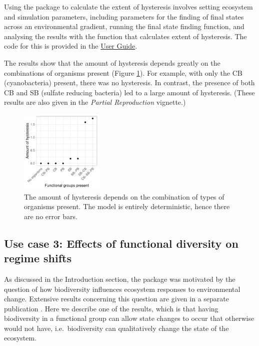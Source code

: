 \documentclass[]{elsarticle} %
\begin{document}
Using the package to calculate the extent of hysteresis involves setting ecosystem and simulation parameters, including parameters for the finding of final states across an environmental gradient, running the final state finding function, and analysing the results with the function that calculates extent of hysteresis. The code for this is provided in the \href{https://uzh-peg.r-universe.dev/articles/microxanox/User-guide.html}{User Guide}.

The results show that the amount of hysteresis depends greatly on the combinations of organisms present (Figure \ref{fig:uc2}). For example, with only the CB (cyanobacteria) present, there was no hysteresis. In contrast, the presence of both CB and SB (sulfate reducing bacteria) led to a large amount of hysteresis. (These results are also given in the \emph{Partial Reproduction} vignette.)

\begin{figure}

{\centering \includegraphics[width=150px]{figures/gen_uc2_user_guide_hysteresis} 

}

\caption{The amount of hysteresis depends on the combination of types of organisms present. The model is entirely deterministic, hence there are no error bars.}\label{fig:uc2}
\end{figure}

\hypertarget{use-case-3-effects-of-functional-diversity-on-regime-shifts}{%
\subsection{Use case 3: Effects of functional diversity on regime shifts}\label{use-case-3-effects-of-functional-diversity-on-regime-shifts}}

As discussed in the Introduction section, the package was motivated by the question of how biodiversity influences ecosystem responses to environmental change. Extensive results concerning this question are given in a separate publication \citet{Limberger2023}. Here we describe one of the results, which is that having biodiversity in a functional group can allow state changes to occur that otherwise would not have, i.e.~biodiversity can qualitatively change the state of the ecosystem.
\end{document}

